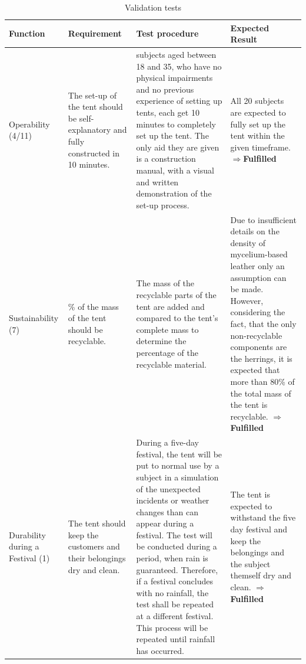 \documentclass{article}
\begin{document}
\begin{table}[ht!]
    \caption{Validation tests}
    \label{tab:validation}
    \begin{tabularx}{\textwidth}{|>{\raggedright\arraybackslash}p{2.5cm}|>{\raggedright\arraybackslash}p{3.5cm}|>{\raggedright\arraybackslash}p{6cm}|>{\raggedright\arraybackslash}X|}
    \hline
    \textbf{Function} & \textbf{Requirement} & \textbf{Test procedure} & \textbf{Expected Result} \\
    \hline
    Operability (4/11) & 
    The set-up of the tent should be self-explanatory and fully constructed in 10 minutes. & 
    20 subjects aged between 18 and 35, who have no physical impairments and no previous experience of setting up tents, each get 10 minutes to completely set up the tent. The only aid they are given is a construction manual, with a visual and written demonstration of the set-up process. &
    All 20 subjects are expected to fully set up the tent within the given timeframe. $\Rightarrow$\textcolor{newgreen}{\textbf{Fulfilled}} \\
    \hline
    Sustainability (7) &
    80\% of the mass of the tent should be recyclable. &
    The mass of the recyclable parts of the tent are added and compared to the tent’s complete mass to determine the percentage of the recyclable material. &
    Due to insufficient details on the density of mycelium-based leather only an assumption can be made. However, considering the fact, that the only non-recyclable components are the herrings, it is expected that more than 80\% of the total mass of the tent is recyclable. $\Rightarrow$\textcolor{newgreen}{\textbf{Fulfilled}} \\
    \hline
    Durability during a Festival (1) &
    The tent should keep the customers and their belongings dry and clean. &
    During a five-day festival, the tent will be put to normal use by a subject in a simulation of the unexpected incidents or weather changes than can appear during a festival. The test will be conducted during a period, when rain is guaranteed. Therefore, if a festival concludes with no rainfall, the test shall be repeated at a different festival. This process will be repeated until rainfall has occurred. &
    The tent is expected to withstand the five day festival and keep the belongings and the subject themself dry and clean. $\Rightarrow$\textcolor{newgreen}{\textbf{Fulfilled}} \\
    \hline
    \end{tabularx}
\end{table}
\end{document}
